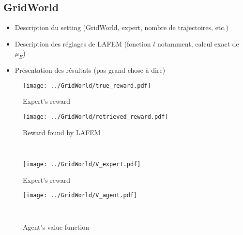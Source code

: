 \documentclass[publibook-draft]{CAp2012}
\begin{document}
\subsection{GridWorld}
\begin{itemize}
\item Description du setting (GridWorld, expert, nombre de trajectoires, etc.)
\item Description des réglages de LAFEM (fonction $l$ notamment, calcul exact de $\mu_E$)
\item Présentation des résultats (pas grand chose à dire)
\end{itemize}
\begin{figure}
\begin{minipage}[t]{.4\linewidth}
    \begin{center}
       \texttt{[image: ../GridWorld/true\_reward.pdf]}
       \caption{Expert's reward}
       \label{nbabo}
    \end{center}
\end{minipage}
\hfill
\begin{minipage}[t]{.4\linewidth}
    \begin{center}
       \texttt{[image: ../GridWorld/retrieved\_reward.pdf]}
       \caption{Reward found by LAFEM}
       \label{croissnbabo}
    \end{center}
\end{minipage}\\
\begin{minipage}[t]{.4\linewidth}
    \begin{center}
       \texttt{[image: ../GridWorld/V\_expert.pdf]}
       \caption{Expert's reward}
       \label{nbabo}
    \end{center}
\end{minipage}
\hfill
\begin{minipage}[t]{.4\linewidth}
    \begin{center}
       \texttt{[image: ../GridWorld/V\_agent.pdf]}
       \caption{Agent's value function}
       \label{croissnbabo}
    \end{center}
\end{minipage}\\

\end{figure}
\end{document}
